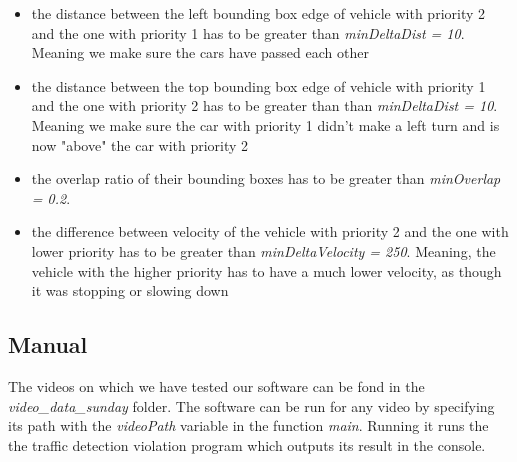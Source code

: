 \documentclass[12pt]{article} %
\begin{document}
\begin{itemize}
\item the distance between the left bounding box edge of vehicle with priority 2 and the one with priority 1 has to be greater than \textit{ minDeltaDist = 10}. Meaning we make sure the cars have passed each other

\item the distance between the top bounding box edge of vehicle with priority 1 and the one with priority 2 has to be greater than than \textit{ minDeltaDist = 10}. Meaning we make sure the car with priority 1 didn't make a left turn and is now "above" the car with priority 2

\item the overlap ratio of their bounding boxes has to be greater than \textit{ minOverlap = 0.2}.
\item the difference between velocity \footnotemark of the vehicle with priority 2 and the one with lower priority has to be greater than  \textit{ minDeltaVelocity = 250}. 
Meaning, the vehicle with the higher priority has to have a much lower velocity, as though it was stopping or slowing down
\end{itemize}

\subsection{Manual}
The videos on which we have tested our software can be fond in the \textit{video\_data\_sunday} folder. 
The software can be run for any video by specifying its path with the \textit{videoPath} variable in the function \textit{main}.
Running it runs the the traffic detection violation program which outputs its result in the console. 

\end{document}

